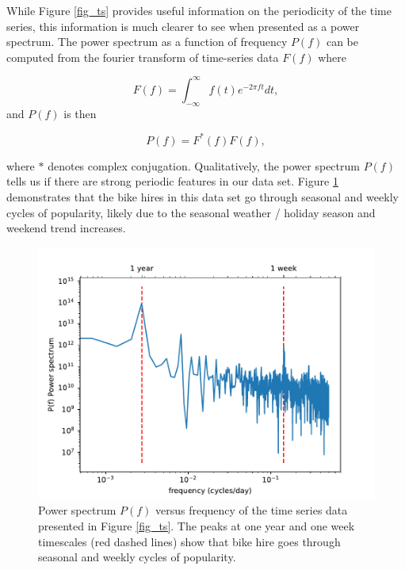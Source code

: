 \documentclass[10pt]{article}
\begin{document}
While Figure \ref{fig_ts} provides useful information on the periodicity of the time series, this information is much clearer to see when presented as a power spectrum. The power spectrum as a function of frequency $P(f)$ can be computed from the fourier transform of time-series data $F(f)$ where

\begin{equation}
\label{eq_ft}
F(f) = \int_{-\infty}^{\infty} f(t) e^{-2\pi f t} dt,
\end{equation}
\noindent and $P(f)$ is then

\begin{equation}
\label{eq_ps}
P(f) = F^*(f) F(f),
\end{equation}

\noindent where $*$ denotes complex conjugation. Qualitatively, the power spectrum $P(f)$ tells us if there are strong periodic features in our data set. Figure \ref{fig_ps} demonstrates that the bike hires in this data set go through seasonal and weekly cycles of popularity, likely due to the seasonal weather / holiday season and weekend trend increases.





\begin{figure}
\begin{center}
\includegraphics[scale=1.0,angle=0,trim=0cm 0cm 0cm 0cm]{ps_plot.pdf}
\caption{Power spectrum $P(f)$ versus frequency of the time series data presented in Figure \ref{fig_ts}. The peaks at one year and one week timescales (red dashed lines) show that bike hire goes through seasonal and weekly cycles of popularity.}
\label{fig_ps}
\end{center}
\end{figure}
\end{document}
